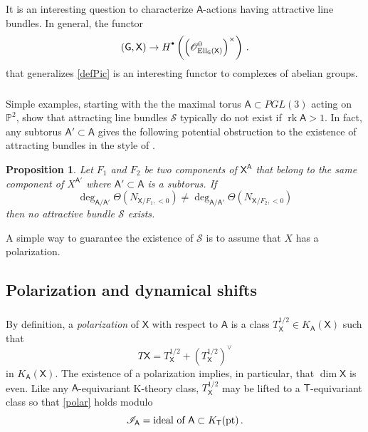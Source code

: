 \documentclass[14pt]{extarticle}
\newcommand{\bT}{\mathsf{T}}
\newcommand{\bA}{\mathsf{A}}
\newcommand{\bG}{\mathsf{G}}
\newcommand{\bX}{\mathsf{X}}
\newcommand{\bP}{\mathbb{P}}
\newcommand{\cI}{\mathscr{I}}
\newcommand{\cS}{\mathscr{S}}
\newcommand{\cO}{\mathscr{O}}
\newcommand{\Hd}{{H}^{\raisebox{0.5mm}{$\scriptscriptstyle \bullet$}}}
\DeclareMathOperator{\Ell}{Ell}
\DeclareMathOperator{\pt}{pt}
\DeclareMathOperator{\rk}{rk}
\newtheorem{Proposition}[Lemma]{Proposition}
\theoremstyle{definition}
\begin{document}
\subsubsection{}
It is an interesting question to characterize $\bA$-actions having
attractive line bundles. In general, the functor
%
\begin{equation}
(\bG,\bX) \to \Hd\left(
  \left(\cO^{0}_{\Ell_\bG(\bX)} \right)^\times \right)
\,.\label{defPic2}
\end{equation}
%
that generalizes \eqref{defPic} is an interesting functor to complexes
of abelian groups.

\subsubsection{}\label{s_attr_obs} 
Simple examples, starting with the the maximal torus
$\bA \subset PGL(3)$ acting on $\bP^2$, show that attracting line bundles
$\cS$ typically do not exist if $\rk \bA > 1$. In fact,
any subtorus $\bA' \subset \bA$ gives the following potential
obstruction to the existence of attracting bundles in the style of
\cite{GKM}. 

\begin{Proposition}
Let $F_1$ and $F_2$ be two
components of $\bX^\bA$ that belong to the same component of
$X^{\bA'}$ where $\bA' \subset \bA$ is a subtorus. If
$$
\deg_{\bA/\bA'} \Theta(N_{\bX/F_1,<0}) \ne
\deg_{\bA/\bA'} \Theta(N_{\bX/F_2,<0})
$$
then no attractive bundle $\cS$ exists. 
\end{Proposition}

\noindent 
A simple way to guarantee the existence of $\cS$ is to assume that
$X$ has a polarization. 



\subsection{Polarization and dynamical shifts}

\subsubsection{} 

By definition, a \emph{polarization} of $\bX$ with respect to $\bA$ is a class 
$T^{1/2}_\bX\in K_\bA(\bX)$ such that
%
\begin{equation}
T\bX = T^{1/2}_\bX + \left(T^{1/2}_\bX\right)^\vee\label{polar}
\end{equation}
%
in $K_\bA(\bX)$.  The existence of a polarization implies,
in particular, that $\dim \bX$ is even. Like any $\bA$-equivariant
K-theory class, $T^{1/2}_\bX$ may be lifted to a $\bT$-equivariant
class so that \eqref{polar} holds modulo
$$
\cI_\bA  = \textup{ideal of $\bA$} \subset K_\bT(\pt) \,.
$$ 
\end{document}
